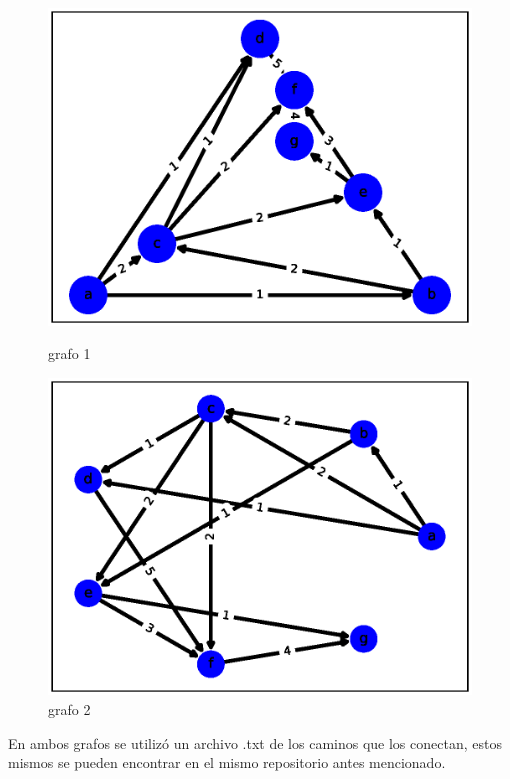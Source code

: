 \documentclass{report}
\begin{document}
\begin{figure}[h!t]
\centering
\begin{minipage}[b]{0.4\linewidth}
\centering
\includegraphics[scale = 0.35]{ejemplo3.eps}
\caption{grafo 1}
\label{fig:1}
\end{minipage}
\hspace{0.5 cm}
\begin{minipage}[b]{0.4\linewidth}
  \centering
  \includegraphics[scale = 0.35]{ejemplo7.eps}
  \caption{grafo 2}
  \label{fig:2}
\end{minipage}
\end{figure}

En ambos grafos se utilizó un archivo .txt de los caminos que los conectan, estos mismos se pueden encontrar en el mismo repositorio antes mencionado.
\end{document}
